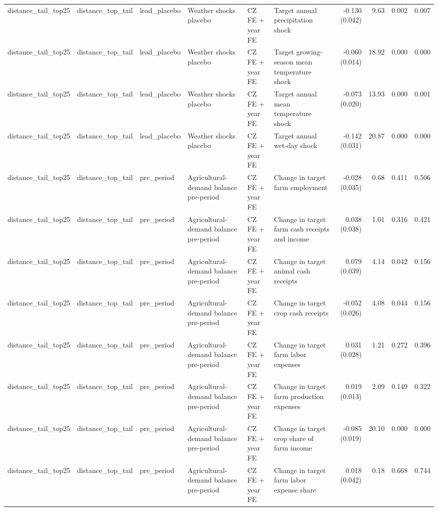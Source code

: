 \begin{tabular}{llllllrrrr}
distance_tail_top25 & distance_top_tail & lead_placebo & Weather shocks placebo & CZ FE + year FE & Target annual precipitation shock & -0.130 (0.042) & 9.63 & 0.002 & 0.007 \\
distance_tail_top25 & distance_top_tail & lead_placebo & Weather shocks placebo & CZ FE + year FE & Target growing-season mean temperature shock & -0.060 (0.014) & 18.92 & 0.000 & 0.000 \\
distance_tail_top25 & distance_top_tail & lead_placebo & Weather shocks placebo & CZ FE + year FE & Target annual mean temperature shock & -0.073 (0.020) & 13.93 & 0.000 & 0.001 \\
distance_tail_top25 & distance_top_tail & lead_placebo & Weather shocks placebo & CZ FE + year FE & Target annual wet-day shock & -0.142 (0.031) & 20.87 & 0.000 & 0.000 \\
distance_tail_top25 & distance_top_tail & pre_period & Agricultural-demand balance pre-period & CZ FE + year FE & Change in target farm employment & -0.028 (0.035) & 0.68 & 0.411 & 0.506 \\
distance_tail_top25 & distance_top_tail & pre_period & Agricultural-demand balance pre-period & CZ FE + year FE & Change in target farm cash receipts and income & 0.038 (0.038) & 1.01 & 0.316 & 0.421 \\
distance_tail_top25 & distance_top_tail & pre_period & Agricultural-demand balance pre-period & CZ FE + year FE & Change in target animal cash receipts & 0.079 (0.039) & 4.14 & 0.042 & 0.156 \\
distance_tail_top25 & distance_top_tail & pre_period & Agricultural-demand balance pre-period & CZ FE + year FE & Change in target crop cash receipts & -0.052 (0.026) & 4.08 & 0.044 & 0.156 \\
distance_tail_top25 & distance_top_tail & pre_period & Agricultural-demand balance pre-period & CZ FE + year FE & Change in target farm labor expenses & 0.031 (0.028) & 1.21 & 0.272 & 0.396 \\
distance_tail_top25 & distance_top_tail & pre_period & Agricultural-demand balance pre-period & CZ FE + year FE & Change in target farm production expenses & 0.019 (0.013) & 2.09 & 0.149 & 0.322 \\
distance_tail_top25 & distance_top_tail & pre_period & Agricultural-demand balance pre-period & CZ FE + year FE & Change in target crop share of farm income & -0.085 (0.019) & 20.10 & 0.000 & 0.000 \\
distance_tail_top25 & distance_top_tail & pre_period & Agricultural-demand balance pre-period & CZ FE + year FE & Change in target farm labor expense share & 0.018 (0.042) & 0.18 & 0.668 & 0.744 \\

\end{tabular}
